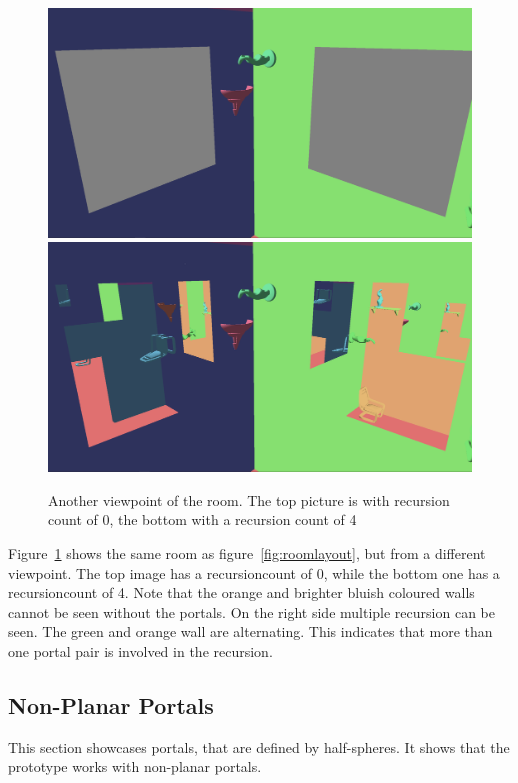 \begin{figure}[H]
	\includegraphics[width=\linewidth]{images/roomportalsr0.png}
	\includegraphics[width=\linewidth]{images/roomportals.png}
	\caption{Another viewpoint of the room. The top picture is with recursion count of 0, the bottom with a recursion count of 4}
	\label{fig:room}
\end{figure}


Figure~\ref{fig:room} shows the same room as figure~\ref{fig:roomlayout}, but from a different viewpoint. The top image has a \gls{recursioncount} of 0, while the bottom one has a \gls{recursioncount} of 4. Note that the orange and brighter bluish coloured walls cannot be seen without the portals. On the right side multiple recursion can be seen. The green and orange wall are alternating. This indicates that more than one portal pair is involved in the recursion.

\subsection{Non-Planar Portals}
\label{section:nonplanar}

This section showcases portals, that are defined by half-spheres. It shows that the prototype works with non-planar portals.

